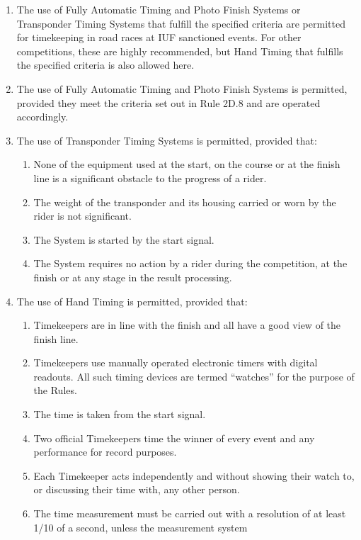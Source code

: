 	\begin{enumerate}[leftmargin=1.5em,labelsep=*]
		\item The use of Fully Automatic Timing and Photo Finish Systems or Transponder Timing Systems that fulfill the 
    specified criteria are permitted for timekeeping in road races at IUF sanctioned events.
		For other competitions, these are highly recommended, but Hand Timing that fulfills the specified criteria is also allowed here.
		\item The use of Fully Automatic Timing and Photo Finish Systems is permitted, 
    provided they meet the criteria set out in Rule 2D.8 and are operated accordingly.
		\item The use of Transponder Timing Systems is permitted, provided that:
		\begin{enumerate}[label=\roman*,leftmargin=2.25em,labelsep=*]
			\item None of the equipment used at the start, on the course or at the finish line is a significant obstacle to the progress of a rider.
			\item The weight of the transponder and its housing carried or worn by the rider is not significant.
			\item The System is started by the start signal.
			\item The System requires no action by a rider during the competition, at the finish or at any stage in the result processing.
		\end{enumerate}
		\item The use of Hand Timing is permitted, provided that:
		\begin{enumerate}[label=\roman*,leftmargin=2.25em,labelsep=*]
			\item Timekeepers are in line with the finish and all have a good view of the finish line.
			\item Timekeepers use manually operated electronic timers with digital readouts.
			All such timing devices are termed “watches” for the purpose of the Rules.
			\item The time is taken from the start signal.
			\item Two official Timekeepers time the winner of every event and any performance for record purposes.
			\item Each Timekeeper acts independently and without showing their watch to, or discussing their time with, any other person.
			\item The time measurement must be carried out with a resolution of at least 1/10 of a second, unless the measurement system 

\end{enumerate}
\end{enumerate}
